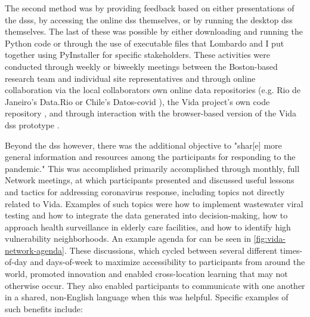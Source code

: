 The second method was by providing feedback based on either presentations of the \acp{dss}, by accessing the online \ac{dss} themselves, or by running the desktop \ac{dss} themselves. The last of these was possible by either downloading and running the Python code or through the use of executable files that Lombardo and I put together using PyInstaller for specific stakeholders. These activities were conducted through weekly or biweekly meetings between the Boston-based research team and individual site representatives and through online collaboration via the local collaborators own online data repositories (e.g. Rio de Janeiro's Data.Rio \cite{institutopereirapassosDataRio2017} or Chile's Datos-\ac{covid} \cite{ministeriodecienciatecnologiaconocimientoeinnovacionDatosCOVID192021}), the Vida project's own code repository \cite{reidMITVidaRepository2021}, and through interaction with the browser-based version of the Vida \ac{dss} prototype \cite{bluerasterMITVidaSupportBoston2021}.

Beyond the \ac{dss} however, there was the additional objective to "shar[e] more general information and resources among the participants for responding to the pandemic." This was accomplished primarily accomplished through monthly, full Network meetings, at which participants presented and discussed useful lessons and tactics for addressing coronavirus response, including topics not directly related to Vida. Examples of such topics were how to implement wastewater viral testing and how to integrate the data generated into decision-making, how to approach health surveillance in elderly care facilities, and how to identify high vulnerability neighborhoods. An example agenda for can be seen in \ref{fig:vida-network-agenda}. These discussions, which cycled between several different times-of-day and days-of-week to maximize accessibility to participants from around the world, promoted innovation and enabled cross-location learning that may not otherwise occur. They also enabled participants to communicate with one another in a shared, non-English language when this was helpful. Specific examples of such benefits include:

